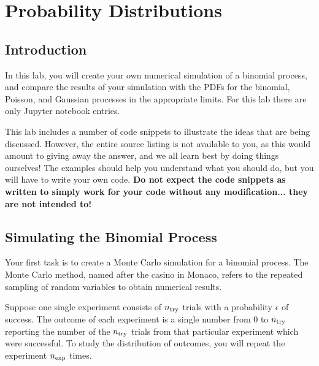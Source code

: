 \chapter{Probability Distributions}

%
%

\section{Introduction}

In this lab, you will create your own numerical simulation of a binomial
process, and compare the results of your simulation with the PDFs for
the binomial, Poisson, and Gaussian processes in the appropriate
limits.  For this lab there are only Jupyter notebook entries. 


This lab includes a number of code snippets to illustrate the ideas
that are being discussed.  However, the entire source listing is not
available to you, as this would amount to giving away the answer, and
we all learn best by doing things ourselves!  The examples should
help you understand what you should do, but you will have to write
your own code.  {\bf Do not expect the code snippets as written to
  simply work for your code without any modification... they are not
  intended to!}

\section{Simulating the Binomial Process}

Your first task is to create a Monte Carlo simulation for a binomial
process.  The Monte Carlo method, named after the casino in Monaco, refers
to the repeated sampling of random variables to obtain numerical results.

Suppose one single experiment consists of $n_{\rm try}$ trials with a
probability $\epsilon$ of success.  The outcome of each experiment is
a single number from 0 to $n_{\rm try}$ reporting the number of the
$n_{\rm try}$ trials from that particular experiment which were
successful.  To study the distribution of outcomes, you will repeat the
experiment $n_{\rm exp}$ times.

